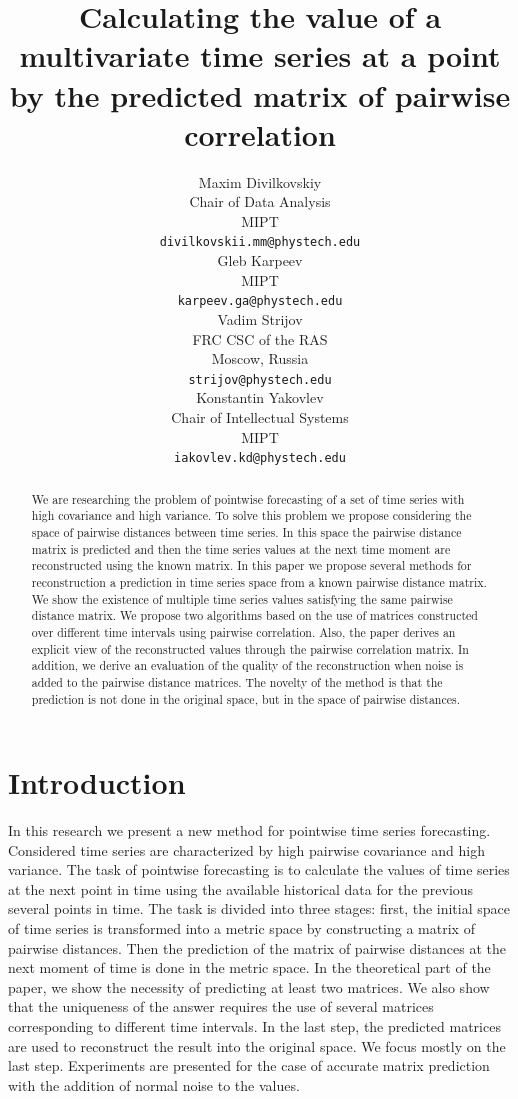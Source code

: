\documentclass{article}
\title{Calculating the value of a multivariate time series at a point by the predicted matrix of pairwise correlation}
\author{ Maxim Divilkovskiy \\
	Chair of Data Analysis\\
	MIPT\\
	\texttt{divilkovskii.mm@phystech.edu} \\
	\And Gleb Karpeev \\
	MIPT\\
	\texttt{karpeev.ga@phystech.edu} \\
	\And
	Vadim Strijov \\
	FRC CSC of the RAS\\
	Moscow, Russia\\
    \texttt{strijov@phystech.edu} \\
    \And
    Konstantin Yakovlev \\
    Chair of Intellectual Systems\\
    MIPT\\
    \texttt{iakovlev.kd@phystech.edu} \\
}
\date{}
\begin{document}
\maketitle

\begin{abstract}
	We are researching the problem of pointwise forecasting of a set of time series with high covariance and high variance. To solve this problem we propose considering the space of pairwise distances between time series. In this space the pairwise distance matrix is predicted and then the time series values at the next time moment are reconstructed using the known matrix. In this paper we propose several methods for reconstruction a prediction in time series space from a known pairwise distance matrix. We show the existence of multiple time series values satisfying the same pairwise distance matrix. We propose two algorithms based on the use of matrices constructed over different time intervals using pairwise correlation. Also, the paper derives an explicit view of the reconstructed values through the pairwise correlation matrix. In addition, we derive an evaluation of the quality of the reconstruction when noise is added to the pairwise distance matrices. The novelty of the method is that the prediction is not done in the original space, but in the space of pairwise distances.


\end{abstract}



\section{Introduction}
 	In this research we present a new method for pointwise time series forecasting. Considered time series are characterized by high pairwise covariance and high variance. The task of pointwise forecasting is to calculate the values of time series at the next point in time using the available historical data for the previous several points in time. The task is divided into three stages: first, the initial space of time series is transformed into a metric space by constructing a matrix of pairwise distances. Then the prediction of the matrix of pairwise distances at the next moment of time is done in the metric space. In the theoretical part of the paper, we show the necessity of predicting at least two matrices. We also show that the uniqueness of the answer requires the use of several matrices corresponding to different time intervals. In the last step, the predicted matrices are used to reconstruct the result into the original space. We focus mostly on the last step. Experiments are presented for the case of accurate matrix prediction with the addition of normal noise to the values.
\end{document}

